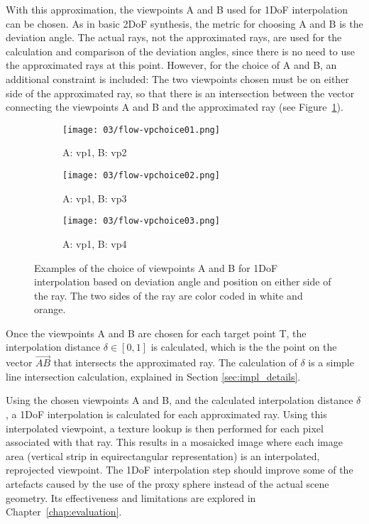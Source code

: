 With this approximation, the viewpoints A and B used for 1DoF interpolation can be chosen. As in basic 2DoF synthesis, the metric for choosing A and B is the deviation angle. The actual rays, not the approximated rays, are used for the calculation and comparison of the deviation angles, since there is no need to use the approximated rays at this point. However, for the choice of A and B, an additional constraint is included: The two viewpoints chosen must be on either side of the approximated ray, so that there is an intersection between the vector connecting the viewpoints A and B and the approximated ray (see Figure~\ref{fig:flow_vpchoice}).

\begin{figure}
\centering
    \hfill
    \begin{subfigure}[t]{0.3\textwidth}
            \centering
            \texttt{[image: 03/flow-vpchoice01.png]}
            \caption{A: vp1, B: vp2}
    \end{subfigure}%
    \hfill
    \begin{subfigure}[t]{0.3\textwidth}
            \centering
            \texttt{[image: 03/flow-vpchoice02.png]}
            \caption{A: vp1, B: vp3}
    \end{subfigure}
    \hfill
    \begin{subfigure}[t]{0.3\textwidth}
            \centering
            \texttt{[image: 03/flow-vpchoice03.png]}
            \caption{A: vp1, B: vp4}
    \end{subfigure}%
    \hfill
    \hfill
  \caption[Examples of the choice of viewpoints A and B for 1DoF interpolation]{Examples of the choice of viewpoints A and B for 1DoF interpolation based on deviation angle and position on either side of the ray. The two sides of the ray are color coded in white and orange.} \label{fig:flow_vpchoice}
\end{figure}

Once the viewpoints A and B are chosen for each target point T, the interpolation distance $\delta \in [0,1]$ is calculated, which is the the point on the vector $\overrightarrow{AB}$ that intersects the approximated ray. The calculation of $\delta$ is a simple line intersection calculation, explained in Section \ref{sec:impl_details}.

Using the chosen viewpoints A and B, and the calculated interpolation distance $\delta$, a 1DoF interpolation is calculated for each approximated ray. Using this interpolated viewpoint, a texture lookup is then performed for each pixel associated with that ray. This results in a mosaicked image where each image area (vertical strip in equirectangular representation) is an interpolated, reprojected viewpoint. The 1DoF interpolation step should improve some of the artefacts caused by the use of the proxy sphere instead of the actual scene geometry. Its effectiveness and limitations are explored in Chapter~\ref{chap:evaluation}.

